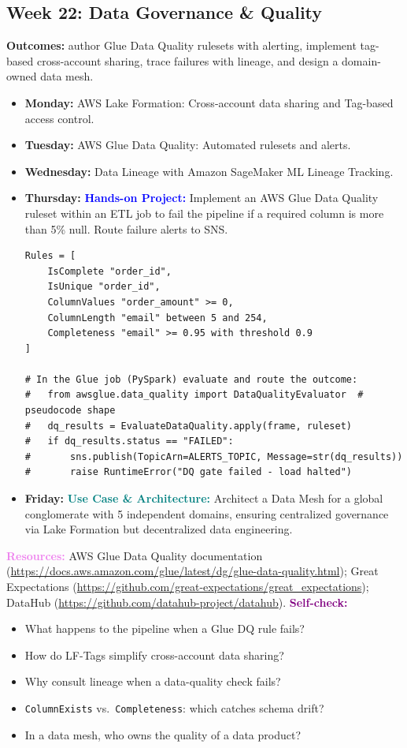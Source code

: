 \documentclass[11pt, a4paper]{article}
\newcommand{\project}[1]{\vspace{1mm}\noindent\textbf{\textcolor{blue}{Hands-on Project:}} #1}
\newcommand{\usecase}[1]{\vspace{1mm}\noindent\textbf{\textcolor{teal}{Use Case \& Architecture:}} #1}
\newcommand{\dayitem}[2]{\item \textbf{#1:} #2}
\newcommand{\resources}[1]{\vspace{1mm}\noindent\textbf{\textcolor{violet}{Resources:}} #1}
\newcommand{\selfcheck}[1]{\vspace{1mm}\noindent\textbf{\textcolor{purple}{Self-check:}} #1}
\begin{document}
\subsection*{Week 22: Data Governance \& Quality}
\par\noindent\textbf{Outcomes:} author Glue Data Quality rulesets with alerting, implement tag-based cross-account sharing, trace failures with lineage, and design a domain-owned data mesh.
\begin{itemize}[label=-]
    \dayitem{Monday}{AWS Lake Formation: Cross-account data sharing and Tag-based access control.}
    \dayitem{Tuesday}{AWS Glue Data Quality: Automated rulesets and alerts.}
    \dayitem{Wednesday}{Data Lineage with Amazon SageMaker ML Lineage Tracking.}
    \dayitem{Thursday}{\project{Implement an AWS Glue Data Quality ruleset within an ETL job to fail the pipeline if a required column is more than 5\% null. Route failure alerts to SNS.}}

\begin{lstlisting}
Rules = [
    IsComplete "order_id",
    IsUnique "order_id",
    ColumnValues "order_amount" >= 0,
    ColumnLength "email" between 5 and 254,
    Completeness "email" >= 0.95 with threshold 0.9
]

# In the Glue job (PySpark) evaluate and route the outcome:
#   from awsglue.data_quality import DataQualityEvaluator  # pseudocode shape
#   dq_results = EvaluateDataQuality.apply(frame, ruleset)
#   if dq_results.status == "FAILED":
#       sns.publish(TopicArn=ALERTS_TOPIC, Message=str(dq_results))
#       raise RuntimeError("DQ gate failed - load halted")
\end{lstlisting}

    \dayitem{Friday}{\usecase{Architect a Data Mesh for a global conglomerate with 5 independent domains, ensuring centralized governance via Lake Formation but decentralized data engineering.}}
\end{itemize}
\resources{AWS Glue Data Quality documentation (\url{https://docs.aws.amazon.com/glue/latest/dg/glue-data-quality.html}); Great Expectations (\url{https://github.com/great-expectations/great_expectations}); DataHub (\url{https://github.com/datahub-project/datahub}).}
\selfcheck{\begin{itemize}[label=-, leftmargin=1.5em, itemsep=0pt]
    \item What happens to the pipeline when a Glue DQ rule fails?
    \item How do LF-Tags simplify cross-account data sharing?
    \item Why consult lineage when a data-quality check fails?
    \item \texttt{ColumnExists} vs.\ \texttt{Completeness}: which catches schema drift?
    \item In a data mesh, who owns the quality of a data product?
\end{itemize}}
\end{document}
